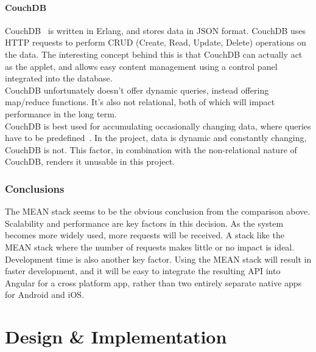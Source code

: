 \documentclass[preprint,12pt,3p]{elsarticle}
\begin{document}
\paragraph{CouchDB}
CouchDB~\cite{couchdb} is written in Erlang, and stores data in JSON format. CouchDB uses HTTP requests to perform CRUD (Create, Read, Update, Delete) operations on the data. 
The interesting concept behind this is that CouchDB can actually act as the applet, and allows easy content management using a control panel integrated into the database.\\
CouchDB unfortunately doesn't offer dynamic queries, instead offering map/reduce functions. It's also not relational, both of which will impact performance in the long term.\\
CouchDB is best used for accumulating occasionally changing data, where queries have to be predefined~\cite{databasecomparison}. In the project, data is dynamic and constantly changing, CouchDB is not. This factor, in combination with the non-relational nature of CouchDB, renders it unusable in this project.

\subsubsection{Conclusions}
The MEAN stack seems to be the obvious conclusion from the comparison above. Scalability and performance are key factors in this decision. As the system becomes more widely used, more requests will be received. A stack like the MEAN stack where the number of requests makes little or no impact is ideal.\\
Development time is also another key factor. Using the MEAN stack will result in faster development, and it will be easy to integrate the resulting API into Angular for a cross platform app, rather than two entirely separate native apps for Android and iOS.



\clearpage

\section{Design \& Implementation}
\end{document}
